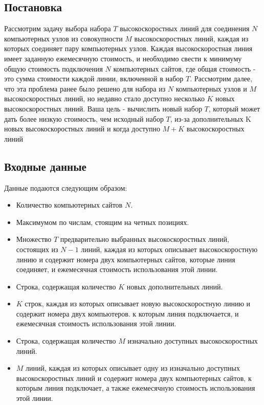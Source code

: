 \documentclass[a4]{article}
\begin{document}
\subsection*{Постановка}
\label{sec:orga2b5149}
Рассмотрим задачу выбора набора \(T\) высокоскоростных линий для соединения \(N\) компьютерных узлов из совокупности \(M\) высокоскоростных линий, каждая из которых соединяет пару компьютерных узлов.
Каждая высокоскоростная линия имеет заданную ежемесячную стоимость, и необходимо свести к минимуму общую стоимость подключения \(N\) компьютерных сайтов, где общая
стоимость - это сумма стоимости каждой линии, включенной в набор \(T\). Рассмотрим далее,
что эта проблема ранее было решено для набора из \(N\) компьютерных узлов и \(M\) высокоскоростных линий, но недавно стало доступно несколько \(K\) новых высокоскоростных линий.
Ваша цель - вычислить новый набор \(T\), который может дать более низкую стоимость,
чем исходный набор \(T\), из-за дополнительных K новых высокоскоростных линий и когда
доступно \(M + K\) высокоскоростных линий
\label{sec:orged795e8}

\subsection*{Входные данные}
\label{sec:orgeb4908d}
Данные подаются следующим образом:\
\begin{itemize}
    \item Количество компьютерных сайтов \(N\).
    \item Максимумом по числам, стоящим на четных позициях.
    \item Множество \(T\) предварительно выбранных высокоскоростных линий, состоящих из \(N - 1\) линий, каждая из которых описывает высокоскоростную линию и содержит номера двух компьютерных сайтов, которые линия соединяет, и ежемесячная стоимость использования этой линии.
    \item Строка, содержащая количество \(K\) новых дополнительных линий.
    \item \(K\) строк, каждая из которых описывает новую высокоскоростную линию и содержит номера двух компьютеров. к которым линия подключается, и ежемесячная стоимость использования этой линии.
    \item Строка, содержащая количество \(M\) изначально доступных высокоскоростных линий.
    \item \(M\) линий, каждая из которых описывает одну из изначально доступных высокоскоростных линий и содержит номера двух компьютерных сайтов, к которым линия подключает, а также ежемесячную стоимость использования этой линии.
\end{itemize}
\end{document}
